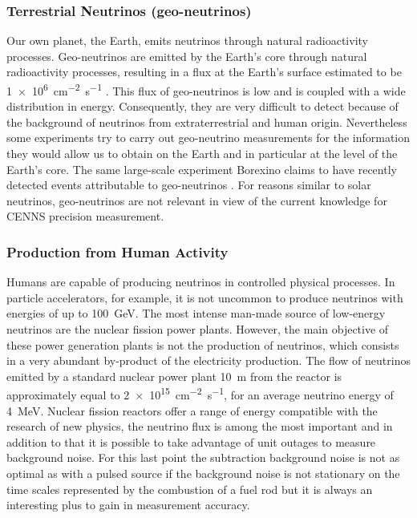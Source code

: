 \subsubsection{Terrestrial Neutrinos (geo-neutrinos)}

Our own planet, the Earth, emits neutrinos through natural radioactivity processes.
Geo-neutrinos are emitted by the Earth's core through natural radioactivity processes, resulting in a flux at the Earth's surface estimated to be \SI{1e6}{\cm^{-2} \s^{-1}} \cite{Bellini:2013}. This flux of geo-neutrinos is low and is coupled with a wide distribution in energy. Consequently, they are very difficult to detect because of the background of neutrinos from extraterrestrial and human origin. Nevertheless some experiments try to carry out geo-neutrino measurements for the information they would allow us to obtain on the Earth and in particular at the level of the Earth's core. The same large-scale experiment Borexino claims to have recently detected events attributable to geo-neutrinos \cite{Agostini:2020geo}.
For reasons similar to solar neutrinos, geo-neutrinos are not relevant in view of the current knowledge for CENNS precision measurement.

\subsubsection{Production from Human Activity}

Humans are capable of producing neutrinos in controlled physical processes. In particle accelerators, for example, it is not uncommon to produce neutrinos with energies of up to \SI{100}{\giga\eV}. The most intense man-made source of low-energy neutrinos are the nuclear fission power plants. However, the main objective of these power generation plants is not the production of neutrinos, which consists in a very abundant by-product of the electricity production. The flow of neutrinos emitted by a standard nuclear power plant \SI{10}{\m} from the reactor is approximately equal to \SI{2e15}{\cm^{-2} \s^{-1}}, for an average neutrino energy of \SI{4}{\mega\eV}. Nuclear fission reactors offer a range of energy compatible with the research of new physics, the neutrino flux is among the most important and in addition to that it is possible to take advantage of unit outages to measure background noise. For this last point the subtraction background noise is not as optimal as with a pulsed source if the background noise is not stationary on the time scales represented by the combustion of a fuel rod but it is always an interesting plus to gain in measurement accuracy.


